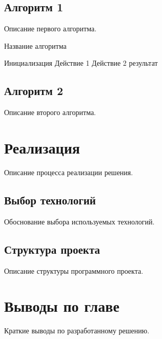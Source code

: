 \subsection{Алгоритм 1}

Описание первого алгоритма.

\begin{algorithm}
\caption{Название алгоритма}
\begin{algorithmic}[1]
\STATE Инициализация
    \STATE Действие 1
    \STATE Действие 2
\ENDWHILE
\RETURN результат
\end{algorithmic}
\end{algorithm}

\subsection{Алгоритм 2}

Описание второго алгоритма.

\section{Реализация}

Описание процесса реализации решения.

\subsection{Выбор технологий}

Обоснование выбора используемых технологий.

\subsection{Структура проекта}

Описание структуры программного проекта.

\section{Выводы по главе}

Краткие выводы по разработанному решению.
